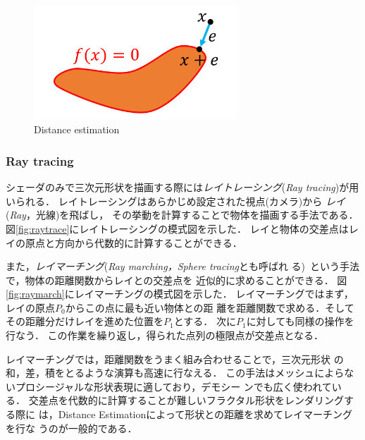  \begin{figure}[htbp]
  \center
  \includegraphics[width=3in, keepaspectratio]{../img/fractal/distance-estimate.pdf}
  \caption{Distance estimation}
  \label{fig:distance-estimate}
 \end{figure}

\subsubsection{Ray tracing}

シェーダのみで三次元形状を描画する際には\emph{レイトレーシング}({\it Ray
tracing})が用いられる．
レイトレーシングはあらかじめ設定された視点(カメラ)から
\emph{レイ}({\it Ray}，光線)を飛ばし，
その挙動を計算することで物体を描画する手法である．
図\ref{fig:raytrace}にレイトレーシングの模式図を示した．
レイと物体の交差点はレイの原点と方向から代数的に計算することができる．

また，\emph{レイマーチング}({\it Ray marching，Sphere tracing}とも呼ばれ
る)~\cite{hart1996sphere}という手法で，物体の距離関数からレイとの交差点を
近似的に求めることができる．
図\ref{fig:raymarch}にレイマーチングの模式図を示した．
レイマーチングではまず，レイの原点$P_0$からこの点に最も近い物体との距
離を距離関数で求める．そしてその距離分だけレイを進めた位置を$P_1$とする．
次に$P_1$に対しても同様の操作を行なう．
この作業を繰り返し，得られた点列の極限点が交差点となる．

レイマーチングでは，距離関数をうまく組み合わせることで，三次元形状
の和，差，積をとるような演算も高速に行なえる．
この手法はメッシュによらないプロシージャルな形状表現に適しており，デモシー
ンでも広く使われている．
交差点を代数的に計算することが難しいフラクタル形状をレンダリングする際に
は，Distance Estimationによって形状との距離を求めてレイマーチングを行な
うのが一般的である．

